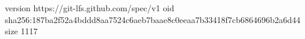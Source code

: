 version https://git-lfs.github.com/spec/v1
oid sha256:187ba2f52a4bddd8aa7524c6aeb7baae8c0eeaa7b33418f7cb6864696b2a6d44
size 1117
